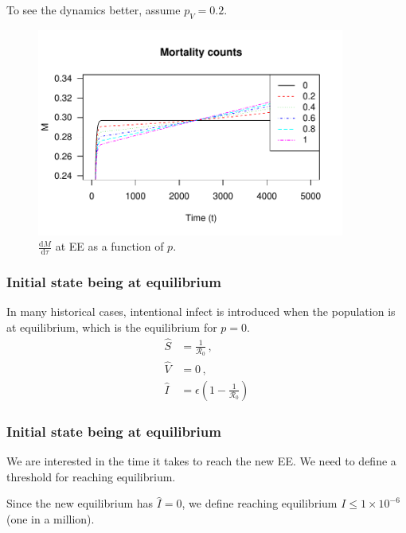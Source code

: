 \documentclass{beamer}
\newcommand\dbyd[2]{\frac{\mathrm d{#1}}{\mathrm d{#2}}}
\newcommand{\R}{\mathcal{R}}
\newcommand{\pmV}{p_{V}}
\begin{document}
\begin{frame}
To see the dynamics better, assume $\pmV=0.2$.
\begin{figure}[H]
  \centering
  \includegraphics[width=0.9\textwidth]{Figures/Rplot.pdf}
  \caption{$\dbyd{M}{\tau}$ at EE as a function of $p$.}
\label{fig:dMdt}
\end{figure}
\end{frame}
\begin{frame}
\frametitle{Initial state being at equilibrium}

In many historical cases, intentional infect is introduced when the population is at equilibrium, which is the equilibrium for $p=0$.
\pause
\begin{subequations}
\begin{align}
\hat{S} &= \frac{1}{\R_0} \,,\\
\hat{V} &= 0\,,\\
\hat{I} &= \epsilon(1-\frac{1}{\R_0})
\end{align}
\end{subequations}
\end{frame}
\begin{frame}
\frametitle{Initial state being at equilibrium}
We are interested in the time it takes to reach the new EE. We need to define a threshold for reaching equilibrium.
\pause

Since the new equilibrium has $\hat{I}=0$, we define reaching equilibrium $I\leq 1\times 10^{-6}$ (one in a million).
\end{frame}
\end{document}
